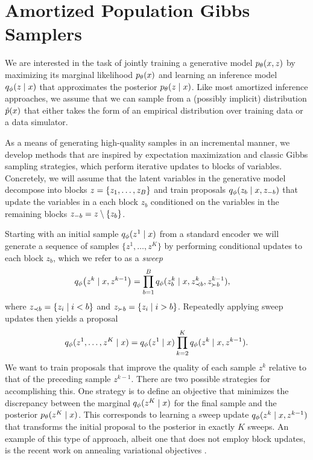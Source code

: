 \documentclass{article}
\theoremstyle{definition}
\begin{document}
\section{Amortized Population Gibbs Samplers}
\label{sec:amortized-gibbs}
We are interested in the task of jointly training a generative model $p_\theta(x, z)$ by maximizing its marginal likelihood $p_\theta(x)$ and learning an inference model $q_\phi(z \mid x)$ that approximates the posterior $p_\theta(z \mid x)$. Like most amortized inference approaches, we assume that we can sample from a (possibly implicit) distribution $\hat{p}(x)$ that either takes the form of an empirical distribution over training data or a data simulator.

As a means of generating high-quality samples in an incremental manner, we develop methods that are inspired by expectation maximization and classic Gibbs sampling strategies, which perform iterative updates to blocks of variables. Concretely, we will assume that the latent variables in the generative model decompose into blocks $z = \{z_1, \ldots, z_B\}$ and train proposals $q_\phi(z_b \mid x, z_{-b})$ that update the variables in a each block $z_{b}$ conditioned on the variables in the remaining blocks $z_{-b} = z \setminus \{z_b\}$.

Starting with an initial sample $q_\phi(z^{1} \mid x)$ from a standard encoder we will generate a sequence of samples $\{z^1, \ldots, z^K\}$ by performing conditional updates to each block $z_b$, which we refer to as a \emph{sweep}
\begin{align}
    \label{eq:approx-gibbs-kernel}
    q_\phi \big( z^k \mid x, z^{k-1} \big)
    &=
    \prod_{b=1}^B
    q_\phi(z^k_b \mid x, z^{k}_{\prec b}, z^{k-1}_{\succ b})
    ,
\end{align}
where $z_{\prec b} = \{z_i \mid i < b\}$ and $z_{\succ b} = \{z_i \mid i > b\}$. Repeatedly applying sweep updates then yields a proposal
\begin{equation*}
    q_\phi(z^1, \ldots, z^K \mid x) 
    =
    q_\phi(z^1 \mid x)
    \prod_{k=2}^K
    q_\phi(z^k \mid x, z^{k-1}).
\end{equation*}
We want to train proposals that improve the quality of each sample $z^k$ relative to that of the preceding sample $z^{k-1}$. There are two possible strategies for accomplishing this. One strategy is to define an objective that minimizes the discrepancy between the marginal $q_\phi(z^K \mid x)$ for the final sample and the posterior $p_\theta(z^K \mid x)$. This corresponds to learning a sweep update $q_\phi(z^k \mid x, z^{k-1})$ that transforms the initial proposal to the posterior in exactly $K$ sweeps. An example of this type of approach, albeit one that does not employ block updates, is the recent work on annealing variational objectives \cite{huang2018improving}.
\end{document}
